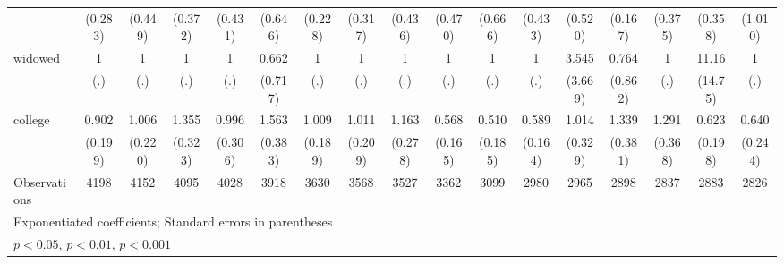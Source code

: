 {\begin{tabular}{l*{16}{c}}
                    &     (0.283)         &     (0.449)         &     (0.372)         &     (0.431)         &     (0.646)         &     (0.228)         &     (0.317)         &     (0.436)         &     (0.470)         &     (0.666)         &     (0.433)         &     (0.520)         &     (0.167)         &     (0.375)         &     (0.358)         &     (1.010)         \\
[1em]
widowed             &           1         &           1         &           1         &           1         &       0.662         &           1         &           1         &           1         &           1         &           1         &           1         &       3.545         &       0.764         &           1         &       11.16         &           1         \\
                    &         (.)         &         (.)         &         (.)         &         (.)         &     (0.717)         &         (.)         &         (.)         &         (.)         &         (.)         &         (.)         &         (.)         &     (3.669)         &     (0.862)         &         (.)         &     (14.75)         &         (.)         \\
[1em]
college             &       0.902         &       1.006         &       1.355         &       0.996         &       1.563         &       1.009         &       1.011         &       1.163         &       0.568         &       0.510         &       0.589         &       1.014         &       1.339         &       1.291         &       0.623         &       0.640         \\
                    &     (0.199)         &     (0.220)         &     (0.323)         &     (0.306)         &     (0.383)         &     (0.189)         &     (0.209)         &     (0.278)         &     (0.165)         &     (0.185)         &     (0.164)         &     (0.329)         &     (0.381)         &     (0.368)         &     (0.198)         &     (0.244)         \\
\hline
Observations        &        4198         &        4152         &        4095         &        4028         &        3918         &        3630         &        3568         &        3527         &        3362         &        3099         &        2980         &        2965         &        2898         &        2837         &        2883         &        2826         \\
\hline\hline
\multicolumn{17}{l}{\footnotesize Exponentiated coefficients; Standard errors in parentheses}\\
\multicolumn{17}{l}{\footnotesize \sym{*} \(p<0.05\), \sym{**} \(p<0.01\), \sym{***} \(p<0.001\)}\\
\end{tabular}
}
